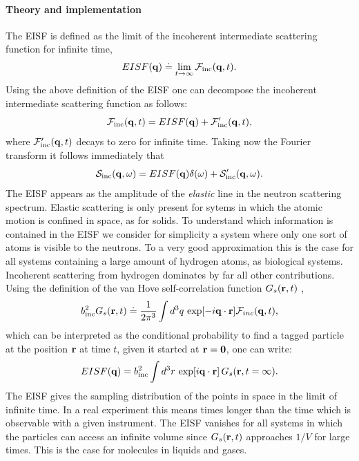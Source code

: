 \documentclass[a4paper,11pt]{article}
\begin{document}
\paragraph{Theory and implementation\\}
\label{eisf_theory}
The \gls{EISF} is defined as the limit of the incoherent intermediate scattering function 
for infinite time,
\begin{equation}
\label{eq:eisf}
EISF({\bf q}) \doteq \lim_{t \to \infty} {\cal F}_{\mathrm{inc}}({\bf q},t).
\end{equation}
Using the above definition of the EISF one can decompose the incoherent intermediate scattering function as follows:
\begin{equation}
{\cal F}_{\mathrm{inc}}({\bf q},t) = EISF({\bf q}) + {\cal F}_{\mathrm{inc}}'({\bf q},t),
\end{equation}
where ${\cal F}_{\mathrm{inc}}'({\bf q},t)$ decays to zero for infinite time.
Taking now the Fourier transform it follows immediately that
\begin{equation}
{\cal S}_{\mathrm{inc}}({\bf q},\omega) = EISF({\bf q})\delta(\omega) 
+ {\cal S}'_{\mathrm{inc}}({\bf q},\omega).
\end{equation}
The \gls{EISF} appears as the amplitude of the {\em elastic} line in the neutron scattering spectrum. Elastic scattering is 
only present for sytems in which the atomic motion is confined in space, as for solids. To understand which information 
is contained in the \gls{EISF} we consider for simplicity a system where only one sort of atoms is visible to the neutrons. 
To a very good approximation this is the case for all systems containing a large amount of hydrogen atoms, as biological
systems. Incoherent scattering from hydrogen dominates by far all other contributions. Using the definition of the van Hove 
self-correlation function $G_s({\bf r},t)$ \cite{Lovesey},
\begin{equation}
b_{\mathrm{inc}}^2 G_s({\bf r},t) \doteq \frac{1}{2\pi^3}
\int d^3q\,\exp[-i{\bf q}\cdot{\bf r}] {\cal F}_{inc}({\bf q},t),
\end{equation}
which can be interpreted as the conditional probability to find a tagged particle at the position ${\bf r}$ at time $t$, 
given it started at ${\bf r} = {\bf 0}$,  one can write:
\begin{equation}
\label{eq:eisf_g_s}
EISF({\bf q}) = b_{\mathrm{inc}}^2\int d^3r\,\exp[i{\bf q}\cdot{\bf r}]\,
G_s({\bf r},t=\infty).
\end{equation}
The \gls{EISF} gives the sampling distribution of the points in space in the limit of infinite time. In a real experiment this 
means times longer than the time which is observable with a given instrument. The \gls{EISF} vanishes for all systems in which 
the particles can access an infinite volume since $G_s({\bf r},t)$ approaches $1/V$ for large times. This is the case for 
molecules in liquids and gases.
\end{document}
